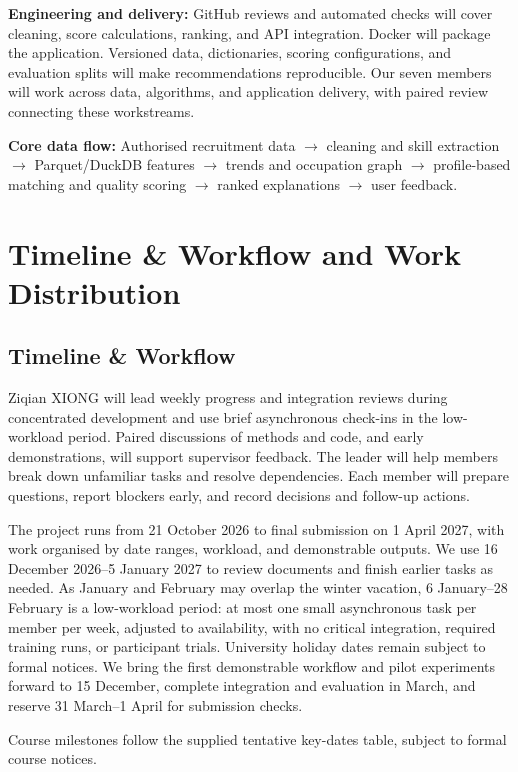 \documentclass[a4paper,12pt]{article}
\begin{document}
\noindent\textbf{Engineering and delivery:}
GitHub reviews and automated checks will cover cleaning, score calculations, ranking, and API integration. Docker will package the application. Versioned data, dictionaries, scoring configurations, and evaluation splits will make recommendations reproducible. Our seven members will work across data, algorithms, and application delivery, with paired review connecting these workstreams.

\medskip
\noindent\textbf{Core data flow:}
Authorised recruitment data $\rightarrow$ cleaning and skill extraction $\rightarrow$ Parquet/DuckDB features $\rightarrow$ trends and occupation graph $\rightarrow$ profile-based matching and quality scoring $\rightarrow$ ranked explanations $\rightarrow$ user feedback.

\newpage
\section{Timeline \& Workflow and Work Distribution}
\subsection{Timeline \& Workflow}
Ziqian XIONG will lead weekly progress and integration reviews during concentrated development and use brief asynchronous check-ins in the low-workload period. Paired discussions of methods and code, and early demonstrations, will support supervisor feedback. The leader will help members break down unfamiliar tasks and resolve dependencies. Each member will prepare questions, report blockers early, and record decisions and follow-up actions.

The project runs from 21 October 2026 to final submission on 1 April 2027, with work organised by date ranges, workload, and demonstrable outputs. We use 16 December 2026--5 January 2027 to review documents and finish earlier tasks as needed. As January and February may overlap the winter vacation, 6 January--28 February is a low-workload period: at most one small asynchronous task per member per week, adjusted to availability, with no critical integration, required training runs, or participant trials. University holiday dates remain subject to formal notices. We bring the first demonstrable workflow and pilot experiments forward to 15 December, complete integration and evaluation in March, and reserve 31 March--1 April for submission checks.

Course milestones follow the supplied tentative key-dates table, subject to formal course notices.
\end{document}
